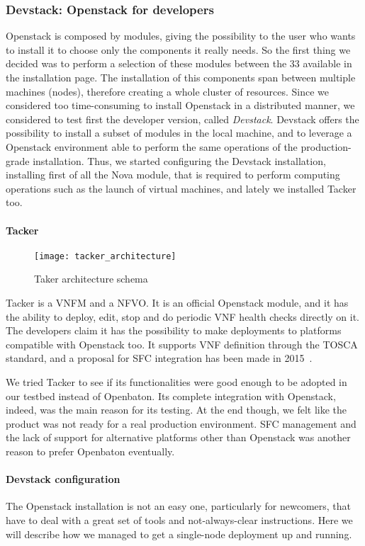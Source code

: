 \subsubsection{Devstack: Openstack for developers}
Openstack is composed by modules, giving the possibility to the user who wants
to install it to choose only the components it really needs. So the first thing
we decided was to perform a selection of these modules between the 33 available
in the installation page. The installation of this components span between
multiple machines (nodes), therefore creating a whole cluster of resources.
Since we considered too time-consuming to install Openstack in a distributed
manner, we considered to test first the developer version, called
\emph{Devstack}. Devstack offers the possibility to install a subset of modules
in the local machine, and to leverage a Openstack environment able to perform
the same operations of the production-grade installation. Thus, we started
configuring the Devstack installation, installing first of all the Nova module,
that is required to perform computing operations such as the launch of virtual
machines, and lately we installed Tacker too.

\paragraph*{Tacker}
\begin{figure}[t]
  \centering
  \texttt{[image: tacker\_architecture]}
  \caption[Taker architecture schema]{Taker architecture
    schema~\cite{tackerOpenstackwiki}}
\end{figure}
Tacker is a VNFM and a NFVO. It is an official Openstack module, and it has the
ability to deploy, edit, stop and do periodic VNF health checks directly on it.
The developers claim it has the possibility to make deployments to platforms
compatible with Openstack too. It supports VNF definition through the TOSCA
standard, and a proposal for SFC integration has been made in
2015~\cite{tackerOpenstackwiki}.

We tried Tacker to see if its functionalities were good enough to be adopted in
our testbed instead of Openbaton. Its complete integration with Openstack,
indeed, was the main reason for its testing. At the end though, we felt like the
product was not ready for a real production environment. SFC management and the
lack of support for alternative platforms other than Openstack was another
reason to prefer Openbaton eventually.

\paragraph*{Devstack configuration}
The Openstack installation is not an easy one, particularly for newcomers, that 
have to deal with a great set of tools and not-always-clear instructions. Here 
we will describe how we managed to get a single-node deployment up and running.

